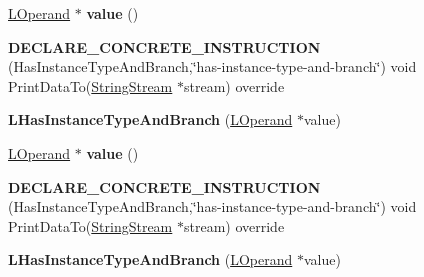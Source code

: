 \begin{DoxyCompactItemize}
\item 
\hyperlink{classv8_1_1internal_1_1_l_operand}{L\+Operand} $\ast$ {\bfseries value} ()\hypertarget{classv8_1_1internal_1_1_l_has_instance_type_and_branch_a33c5f4ece667b3cc856cdba5e0ffa217}{}\label{classv8_1_1internal_1_1_l_has_instance_type_and_branch_a33c5f4ece667b3cc856cdba5e0ffa217}

\item 
{\bfseries D\+E\+C\+L\+A\+R\+E\+\_\+\+C\+O\+N\+C\+R\+E\+T\+E\+\_\+\+I\+N\+S\+T\+R\+U\+C\+T\+I\+ON} (Has\+Instance\+Type\+And\+Branch,\char`\"{}has-\/instance-\/type-\/and-\/branch\char`\"{}) void Print\+Data\+To(\hyperlink{classv8_1_1internal_1_1_string_stream}{String\+Stream} $\ast$stream) override\hypertarget{classv8_1_1internal_1_1_l_has_instance_type_and_branch_a3d0add74c6215d7b2c0629955bf970a3}{}\label{classv8_1_1internal_1_1_l_has_instance_type_and_branch_a3d0add74c6215d7b2c0629955bf970a3}

\item 
{\bfseries L\+Has\+Instance\+Type\+And\+Branch} (\hyperlink{classv8_1_1internal_1_1_l_operand}{L\+Operand} $\ast$value)\hypertarget{classv8_1_1internal_1_1_l_has_instance_type_and_branch_aa3a1c79111e30f9b59c15e5d022becdf}{}\label{classv8_1_1internal_1_1_l_has_instance_type_and_branch_aa3a1c79111e30f9b59c15e5d022becdf}

\item 
\hyperlink{classv8_1_1internal_1_1_l_operand}{L\+Operand} $\ast$ {\bfseries value} ()\hypertarget{classv8_1_1internal_1_1_l_has_instance_type_and_branch_a33c5f4ece667b3cc856cdba5e0ffa217}{}\label{classv8_1_1internal_1_1_l_has_instance_type_and_branch_a33c5f4ece667b3cc856cdba5e0ffa217}

\item 
{\bfseries D\+E\+C\+L\+A\+R\+E\+\_\+\+C\+O\+N\+C\+R\+E\+T\+E\+\_\+\+I\+N\+S\+T\+R\+U\+C\+T\+I\+ON} (Has\+Instance\+Type\+And\+Branch,\char`\"{}has-\/instance-\/type-\/and-\/branch\char`\"{}) void Print\+Data\+To(\hyperlink{classv8_1_1internal_1_1_string_stream}{String\+Stream} $\ast$stream) override\hypertarget{classv8_1_1internal_1_1_l_has_instance_type_and_branch_a3d0add74c6215d7b2c0629955bf970a3}{}\label{classv8_1_1internal_1_1_l_has_instance_type_and_branch_a3d0add74c6215d7b2c0629955bf970a3}

\item 
{\bfseries L\+Has\+Instance\+Type\+And\+Branch} (\hyperlink{classv8_1_1internal_1_1_l_operand}{L\+Operand} $\ast$value)\hypertarget{classv8_1_1internal_1_1_l_has_instance_type_and_branch_aa3a1c79111e30f9b59c15e5d022becdf}{}\label{classv8_1_1internal_1_1_l_has_instance_type_and_branch_aa3a1c79111e30f9b59c15e5d022becdf}


\end{DoxyCompactItemize}
